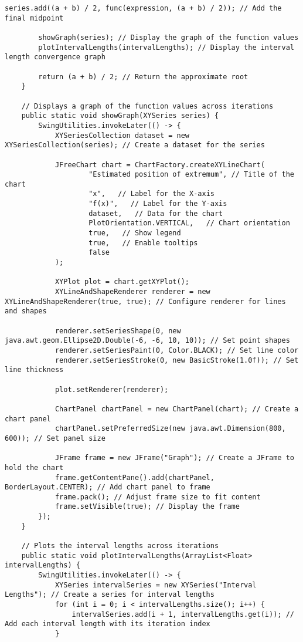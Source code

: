 \begin{lstlisting}[style=JavaStyle, caption={Java Code for Task1}]
        series.add((a + b) / 2, func(expression, (a + b) / 2)); // Add the final midpoint

        showGraph(series); // Display the graph of the function values
        plotIntervalLengths(intervalLengths); // Display the interval length convergence graph

        return (a + b) / 2; // Return the approximate root
    }

    // Displays a graph of the function values across iterations
    public static void showGraph(XYSeries series) {
        SwingUtilities.invokeLater(() -> {
            XYSeriesCollection dataset = new XYSeriesCollection(series); // Create a dataset for the series

            JFreeChart chart = ChartFactory.createXYLineChart(
                    "Estimated position of extremum", // Title of the chart
                    "x",   // Label for the X-axis
                    "f(x)",   // Label for the Y-axis
                    dataset,   // Data for the chart
                    PlotOrientation.VERTICAL,   // Chart orientation
                    true,   // Show legend
                    true,   // Enable tooltips
                    false                              
            );

            XYPlot plot = chart.getXYPlot();
            XYLineAndShapeRenderer renderer = new XYLineAndShapeRenderer(true, true); // Configure renderer for lines and shapes

            renderer.setSeriesShape(0, new java.awt.geom.Ellipse2D.Double(-6, -6, 10, 10)); // Set point shapes
            renderer.setSeriesPaint(0, Color.BLACK); // Set line color
            renderer.setSeriesStroke(0, new BasicStroke(1.0f)); // Set line thickness

            plot.setRenderer(renderer);

            ChartPanel chartPanel = new ChartPanel(chart); // Create a chart panel
            chartPanel.setPreferredSize(new java.awt.Dimension(800, 600)); // Set panel size

            JFrame frame = new JFrame("Graph"); // Create a JFrame to hold the chart
            frame.getContentPane().add(chartPanel, BorderLayout.CENTER); // Add chart panel to frame
            frame.pack(); // Adjust frame size to fit content
            frame.setVisible(true); // Display the frame
        });
    }

    // Plots the interval lengths across iterations
    public static void plotIntervalLengths(ArrayList<Float> intervalLengths) {
        SwingUtilities.invokeLater(() -> {
            XYSeries intervalSeries = new XYSeries("Interval Lengths"); // Create a series for interval lengths
            for (int i = 0; i < intervalLengths.size(); i++) {
                intervalSeries.add(i + 1, intervalLengths.get(i)); // Add each interval length with its iteration index
            }


\end{lstlisting}
